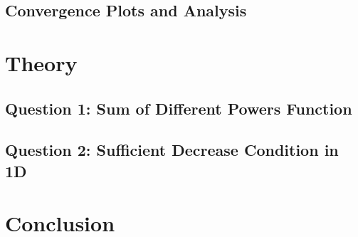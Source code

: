 \documentclass[12pt]{article}
\begin{document}
\subsection{Convergence Plots and Analysis}


\section{Theory}

\subsection{Question 1: Sum of Different Powers Function}

\subsection{Question 2: Sufficient Decrease Condition in 1D}


\section{Conclusion}
\end{document}

